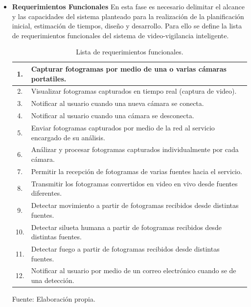 \begin{itemize}
    \item \textbf{Requerimientos Funcionales}
    En esta fase es necesario delimitar el alcance y las capacidades del sistema planteado para la realización de la planificación inicial, estimación de tiempos, diseño y desarrollo. Para ello se define la lista de requerimientos funcionales del sistema de video-vigilancia inteligente.
    
    \begin{table}[H]
        \caption{Lista de requerimientos funcionales.}
        \label{tabla:req_funcionales}
        \begin{center}
            \begin{tabular}{ |c|l|} 
                \hline
                1. & Capturar fotogramas por medio de una o varias cámaras portatiles.\\ \hline
                2. & Visualizar fotogramas capturados en tiempo real (captura de video).\\  \hline
                3. & Notificar al usuario cuando una nueva cámara se conecta.\\  \hline
                4. & Notificar al usuario cuando una cámara se desconecta.\\  \hline
                5. & Enviar fotogramas capturados por medio de la red al servicio encargado de su análisis.\\ \hline
                6. & Análizar y procesar fotogramas capturados individualmente por cada cámara.\\  \hline
                7. & Permitir la recepción de fotogramas de varias fuentes hacia el servicio.\\ \hline
                8. & Transmitir los fotogramas convertidos en video en vivo desde fuentes diferentes.\\ \hline
                9. & Detectar movimiento a partir de fotogramas recibidos desde distintas fuentes.\\ \hline
                10. & Detectar silueta humana a partir de fotogramas recibidos desde distintas fuentes.\\ \hline
                11. & Detectar fuego a partir de fotogramas recibidos desde distintas fuentes.\\ \hline
                12. & Notificar al usuario por medio de un correo electrónico cuando se de una detección.\\ \hline
            \end{tabular}
        \end{center}
        \begin{center}
            Fuente: Elaboración propia.
        \end{center}
    \end{table}


\end{itemize}
